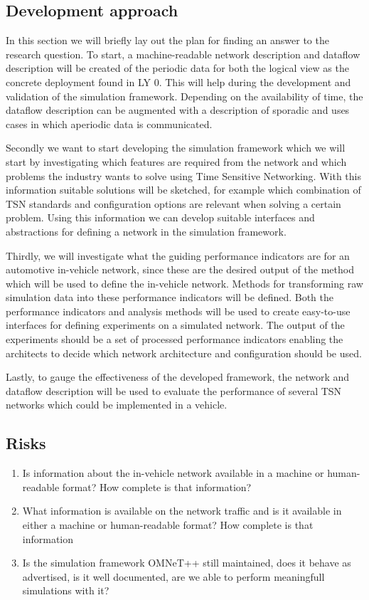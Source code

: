 \subsection{Development approach}
In this section we will briefly lay out the plan for finding an answer to the research question. To start, a machine-readable network description and dataflow description will be created of the periodic data for both the logical view as the concrete deployment found in LY 0. This will help during the development and validation of the simulation framework. Depending on the availability of time, the dataflow description can be augmented with a description of sporadic and uses cases in which aperiodic data is communicated.

Secondly we want to start developing the simulation framework which we will start by investigating which features are required from the network and which problems the industry wants to solve using Time Sensitive Networking. With this information suitable solutions will be sketched, for example which combination of TSN standards and configuration options are relevant when solving a certain problem. Using this information we can develop suitable interfaces and abstractions for defining a network in the simulation framework. 

Thirdly, we will investigate what the guiding performance indicators are for an automotive in-vehicle network, since these are the desired output of the method which will be used to define the in-vehicle network. Methods for transforming raw simulation data into these performance indicators will be defined. Both the performance indicators and analysis methods will be used to create easy-to-use interfaces for defining experiments on a simulated network. The output of the experiments should be a set of processed performance indicators enabling the architects to decide which network architecture and configuration should be used.

Lastly, to gauge the effectiveness of the developed framework, the network and dataflow description will be used to evaluate the performance of several TSN networks which could be implemented in a vehicle.

\subsection{Risks}
\begin{enumerate}
\item Is information about the in-vehicle network available in a machine or human-readable format? How complete is that information?
\item What information is available on the network traffic and is it available in either a machine or human-readable format? How complete is that information
\item Is the simulation framework OMNeT++ still maintained, does it behave as advertised, is it well documented, are we able to perform meaningfull simulations with it?
\end{enumerate}